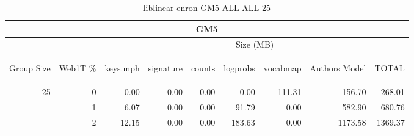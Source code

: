 \begin{center}
\begin{table}[htbp] 
 \begin{center}
\begin{tabular}{ | r | r | r | r | r | r | r | r | r |}
\hline
\multicolumn{9}{|c|}{GM5}\\
\hline
 & & \multicolumn{7}{|c|}{Size (MB)}\\ \cline{3-9}
\begin{sideways}Group Size\end{sideways} & \begin{sideways}Web1T \% \end{sideways} & \begin{sideways}keys.mph\end{sideways} & \begin{sideways}signature\end{sideways} & \begin{sideways}counts\end{sideways} & \begin{sideways}logprobs\end{sideways} & \begin{sideways}vocabmap\end{sideways} & \begin{sideways}Authors Model \end{sideways} & \begin{sideways}TOTAL\end{sideways}\\
\hline
\multirow{2}{*}{25}
 & 0 & 0.00 & 0.00 & 0.00 & 0.00 & 111.31 & 156.70 & 268.01\\ \cline{2-9}
 & 1 & 6.07 & 0.00 & 0.00 & 91.79 & 0.00 & 582.90 & 680.76\\ \cline{2-9}
 & 2 & 12.15 & 0.00 & 0.00 & 183.63 & 0.00 & 1173.58 & 1369.37\\ \cline{2-9}
\hline
\end{tabular}
\caption{liblinear-enron-GM5-ALL-ALL-25}
\label{table:liblinear-enron-GM5-ALL-ALL-25}
\end{center}
 \end{table}
\end{center}

